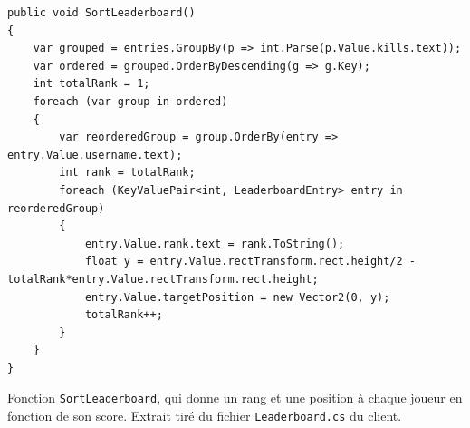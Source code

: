 \documentclass[a4paper]{article}
\begin{document}
\begin{listing}[H]
\begin{verbatim}
public void SortLeaderboard()
{
    var grouped = entries.GroupBy(p => int.Parse(p.Value.kills.text));
    var ordered = grouped.OrderByDescending(g => g.Key);
    int totalRank = 1;
    foreach (var group in ordered)
    {
        var reorderedGroup = group.OrderBy(entry => entry.Value.username.text);
        int rank = totalRank;
        foreach (KeyValuePair<int, LeaderboardEntry> entry in reorderedGroup)
        {
            entry.Value.rank.text = rank.ToString();
            float y = entry.Value.rectTransform.rect.height/2 - totalRank*entry.Value.rectTransform.rect.height;
            entry.Value.targetPosition = new Vector2(0, y);
            totalRank++;
        }
    }
}
\end{verbatim}
\caption{Fonction \texttt{SortLeaderboard}, qui donne un rang et une position à chaque joueur en fonction de son score. Extrait tiré du fichier \texttt{Leaderboard.cs} du client.}
\label{extrait:leaderboard}
\end{listing}
\end{document}
